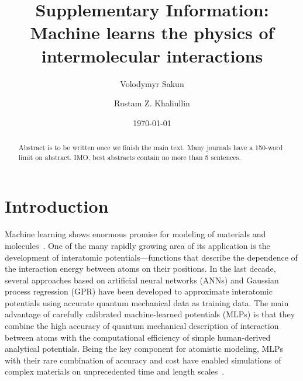 \documentclass[aps,prl,reprint,amsmath,amssymb,nature]{revtex4-1}
\newcommand*{\MAINTEXT}{}
\begin{document}
\newcommand{\Ang}{\ensuremath{\mathring{\text{A}}}}
\newcommand{\red}{\color{red}}
\newcommand{\blue}{\color{blue}}
\newcommand{\old}{\color{black}}




\title{
\ifdefined\MAINTEXT
\else
Supplementary Information: \\
\fi
Machine learns the physics of intermolecular interactions
}

\author{Volodymyr Sakun}
\author{Rustam Z. Khaliullin}

\date{\today}

\ifdefined\MAINTEXT

\begin{abstract}
\red Abstract is to be written once we finish the main text. Many journals have a 150-word limit on abstract. 
IMO, best abstracts contain no more than 5 sentences. \old
\end{abstract}

\maketitle


\section{Introduction}

Machine learning shows enormous promise for modeling of materials and molecules~\cite{ceriotti-science}. 
One of the many rapidly growing area of its application is the development of interatomic potentials---functions that describe the dependence of the interaction energy between atoms on their positions. 
In the last decade, several approaches based on artificial neural networks (ANNs) and Gaussian process regression (GPR) have been 
developed to approximate interatomic potentials using accurate quantum mechanical data as training data. 
The main advantage of carefully calibrated machine-learned potentials (MLPs) is that they combine the high accuracy of quantum mechanical description of interaction between atoms with the computational efficiency of simple human-derived analytical potentials. 
Being the key component for atomistic modeling, MLPs with their rare combination of accuracy and cost have enabled simulations of complex materials on unprecedented time and length scales~\cite{Khaliullin2010,Khaliullin2011,RZK0}. 
\end{document}
